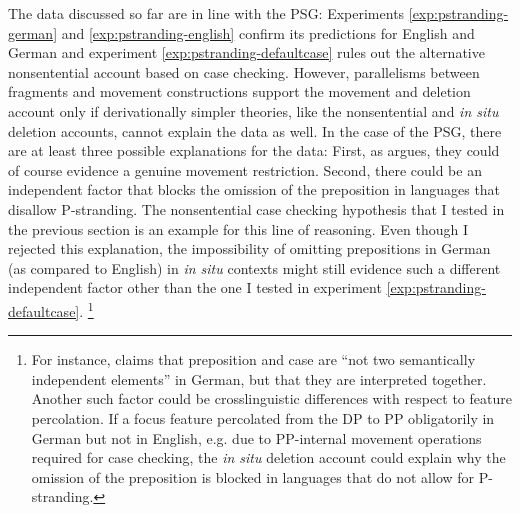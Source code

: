 The data discussed so far are in line with the PSG: Experiments \ref{exp:pstranding-german} and \ref{exp:pstranding-english} confirm its predictions for English and German and experiment \ref{exp:pstranding-defaultcase} rules out the alternative nonsentential account based on case checking. However, parallelisms between fragments and movement constructions support the movement and deletion account only if derivationally simpler theories, like the nonsentential and \textit{in situ} deletion accounts, cannot explain the data as well. In the case of the PSG, there are at least three possible explanations for the data: First, as \citet{merchant2004} argues, they could of course evidence a genuine movement restriction. Second, there could be an independent factor that blocks the omission of the preposition in languages that disallow P-stranding. The nonsentential case checking hypothesis that I tested in the previous section is an example for this line of reasoning. Even though I rejected this explanation, the impossibility of omitting prepositions in German (as compared to English) in \textit{in situ} contexts might still evidence such a different independent factor other than the one I tested in experiment \ref{exp:pstranding-defaultcase}.%
%
\footnote{For instance, \citet[21]{zwarts2005} claims that preposition and case are ``not two semantically independent elements'' in German, but that they are interpreted together. Another such factor could be crosslinguistic differences with respect to feature percolation. If a focus feature percolated from the DP to PP obligatorily in German but not in English, e.g. due to PP-internal movement operations required for case checking, the \textit{in situ} deletion account could explain why the omission of the preposition is blocked in languages that do not allow for P-stranding.}\afterfn%
% 

